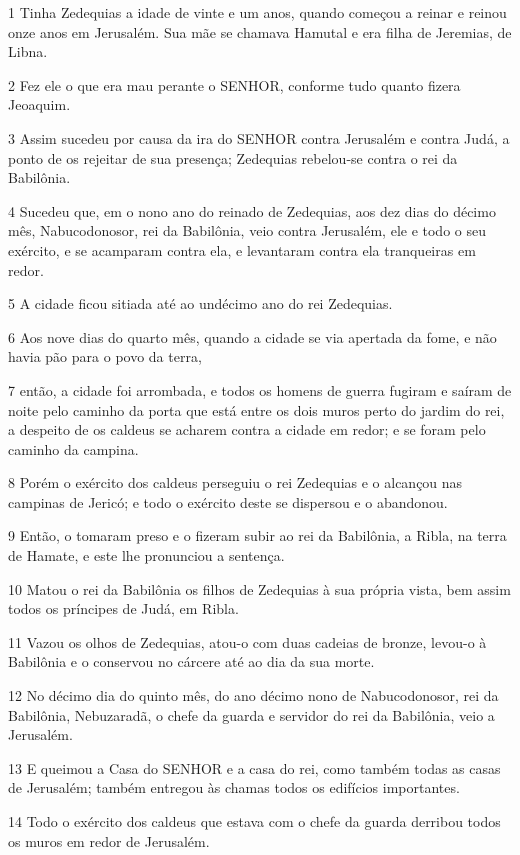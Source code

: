 \par 1 Tinha Zedequias a idade de vinte e um anos, quando começou a reinar e reinou onze anos em Jerusalém. Sua mãe se chamava Hamutal e era filha de Jeremias, de Libna.
\par 2 Fez ele o que era mau perante o SENHOR, conforme tudo quanto fizera Jeoaquim.
\par 3 Assim sucedeu por causa da ira do SENHOR contra Jerusalém e contra Judá, a ponto de os rejeitar de sua presença; Zedequias rebelou-se contra o rei da Babilônia.
\par 4 Sucedeu que, em o nono ano do reinado de Zedequias, aos dez dias do décimo mês, Nabucodonosor, rei da Babilônia, veio contra Jerusalém, ele e todo o seu exército, e se acamparam contra ela, e levantaram contra ela tranqueiras em redor.
\par 5 A cidade ficou sitiada até ao undécimo ano do rei Zedequias.
\par 6 Aos nove dias do quarto mês, quando a cidade se via apertada da fome, e não havia pão para o povo da terra,
\par 7 então, a cidade foi arrombada, e todos os homens de guerra fugiram e saíram de noite pelo caminho da porta que está entre os dois muros perto do jardim do rei, a despeito de os caldeus se acharem contra a cidade em redor; e se foram pelo caminho da campina.
\par 8 Porém o exército dos caldeus perseguiu o rei Zedequias e o alcançou nas campinas de Jericó; e todo o exército deste se dispersou e o abandonou.
\par 9 Então, o tomaram preso e o fizeram subir ao rei da Babilônia, a Ribla, na terra de Hamate, e este lhe pronunciou a sentença.
\par 10 Matou o rei da Babilônia os filhos de Zedequias à sua própria vista, bem assim todos os príncipes de Judá, em Ribla.
\par 11 Vazou os olhos de Zedequias, atou-o com duas cadeias de bronze, levou-o à Babilônia e o conservou no cárcere até ao dia da sua morte.
\par 12 No décimo dia do quinto mês, do ano décimo nono de Nabucodonosor, rei da Babilônia, Nebuzaradã, o chefe da guarda e servidor do rei da Babilônia, veio a Jerusalém.
\par 13 E queimou a Casa do SENHOR e a casa do rei, como também todas as casas de Jerusalém; também entregou às chamas todos os edifícios importantes.
\par 14 Todo o exército dos caldeus que estava com o chefe da guarda derribou todos os muros em redor de Jerusalém.
